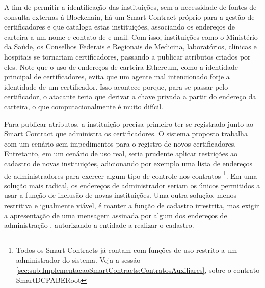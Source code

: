 \documentclass[a4paper,11pt]{article}
\begin{document}
A fim de permitir a identificação das instituições, sem a necessidade de fontes de consulta externas à Blockchain, há um Smart Contract próprio para a gestão de certificadores e que cataloga estas instituições, associando os endereços de carteira a um nome e contato de e-mail.
Com isso, instituições como o Ministério da Saúde, os Conselhos Federais e Regionais de Medicina, laboratórios, clínicas e hospitais se tornariam certificadores, passando a publicar atributos criados por eles. Note que o uso de endereços de carteira Ethereum, como a identidade principal de certificadores, evita que um agente mal intencionado forje a identidade de um certificador. Isso acontece porque, para se passar pelo certificador, o atacante teria que derivar a chave privada a partir do endereço da carteira, o que computacionalmente é muito difícil.

Para publicar atributos, a instituição precisa primeiro ter se registrado junto ao Smart Contract que administra os certificadores.
O sistema proposto trabalha com um cenário sem impedimentos para o registro de novos certificadores.
Entretanto, em um cenário de uso real, seria prudente aplicar restrições ao cadastro de novas instituições, adicionando por exemplo uma lista de endereços de administradores para exercer algum tipo de controle nos contratos
\footnote{Todos os Smart Contracts já contam com funções de uso restrito a um administrador do sistema. Veja a sessão \ref{sec:sub:ImplementacaoSmartContracts:ContratosAuxiliares}, sobre o contrato SmartDCPABERoot}.
Em uma solução mais radical, os endereços de administrador seriam os únicos permitidos a usar a função de inclusão de novas instituições.
Uma outra solução, menos restritiva e igualmente viável, é manter a função de cadastro irrestrita, mas exigir a apresentação de uma mensagem assinada por algum dos endereços de administração \cite{Marx2018}, autorizando a entidade a realizar o cadastro.



\end{document}
